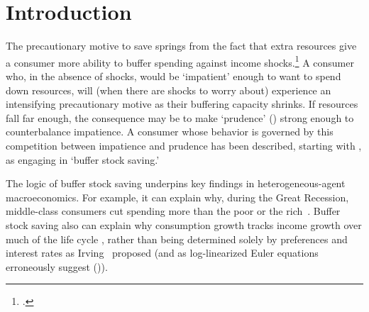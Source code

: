 \documentclass[BufferStockTheory]{subfiles}
\begin{document}
\section{Introduction}\label{sec:intro}
\setcounter{page}{0}

%


The precautionary motive to save springs from the fact that extra resources give a consumer more ability to buffer spending against income shocks.\footnote{\cite{CarrollKimballPSPW}.}  A consumer who, in the absence of shocks, would be `impatient' enough to want to spend down resources, will (when there are shocks to worry about) experience an intensifying precautionary motive as their buffering capacity shrinks.  If resources fall far enough, the consequence may be to make `prudence' (\cite{kimball:standardra}) strong enough to counterbalance impatience.  A consumer whose behavior is governed by this competition between impatience and prudence has been described, starting with \cite{deatonLiqConstr}, as engaging in `buffer stock saving.'


The logic of buffer stock saving underpins key findings in heterogeneous-agent macroeconomics. For example, it can explain why, during the Great Recession, middle-class consumers cut spending more than the poor or the rich~\citep{kmpHandbook}. Buffer stock saving also can explain why consumption growth tracks income growth over much of the life cycle \citep{carrollBSLCPIH}, rather than being determined solely by preferences and interest rates as Irving~\cite{fisherInterestTheory} proposed (and as log-linearized Euler equations erroneously suggest (\cite{carroll:death})).  
\end{document}

